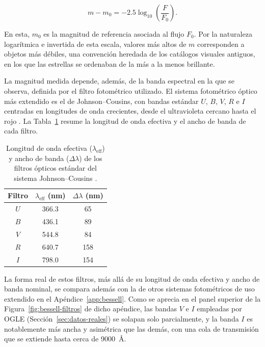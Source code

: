 \documentclass[12pt,letterpaper,oneside]{book}
\begin{document}
\begin{equation}
	m - m_0 = -2.5 \log_{10}\left(\frac{F}{F_0}\right).
	\label{eq:pogson}
\end{equation}

En esta, $m_0$ es la magnitud de referencia asociada al flujo $F_0$. Por la naturaleza logar\'itmica e invertida de esta escala, valores m\'as altos de $m$ corresponden a objetos m\'as d\'ebiles, una convenci\'on heredada de los cat\'alogos visuales antiguos, en los que las estrellas se ordenaban de la m\'as a la menos brillante.

La magnitud medida depende, adem\'as, de la banda espectral en la que se observa, definida por el filtro fotom\'etrico utilizado. El sistema fotom\'etrico \'optico m\'as extendido es el de Johnson--Cousins, con bandas est\'andar $U$, $B$, $V$, $R$ e $I$ centradas en longitudes de onda crecientes, desde el ultravioleta cercano hasta el rojo \citep{Bessell2005}. La Tabla~\ref{tab:filtros} resume la longitud de onda efectiva y el ancho de banda de cada filtro.

\begin{table}[H]
	\centering
	\begin{tabular}{ccc}
		\hline
		\textbf{Filtro} & \textbf{$\lambda_{\text{eff}}$ (nm)} & \textbf{$\Delta\lambda$ (nm)} \\
		\hline
		$U$ & 366.3 & 65 \\
		$B$ & 436.1 & 89 \\
		$V$ & 544.8 & 84 \\
		$R$ & 640.7 & 158 \\
		$I$ & 798.0 & 154 \\
		\hline
	\end{tabular}
	\caption[Longitudes de onda efectivas del sistema Johnson--Cousins]{Longitud de onda efectiva ($\lambda_{\text{eff}}$) y ancho de banda ($\Delta\lambda$) de los filtros \'opticos est\'andar del sistema Johnson--Cousins \citep{Bessell2005}.}
	\label{tab:filtros}
\end{table}

La forma real de estos filtros, m\'as all\'a de su longitud de onda efectiva y ancho de banda nominal, se compara adem\'as con la de otros sistemas fotom\'etricos de uso extendido en el Ap\'endice~\ref{app:bessell}. Como se aprecia en el panel superior de la Figura~\ref{fig:bessell-filtros} de dicho ap\'endice, las bandas $V$ e $I$ empleadas por OGLE (Secci\'on~\ref{sec:datos-reales}) se solapan solo parcialmente, y la banda $I$ es notablemente m\'as ancha y asim\'etrica que las dem\'as, con una cola de transmisi\'on que se extiende hasta cerca de 9000~\AA.
\end{document}
